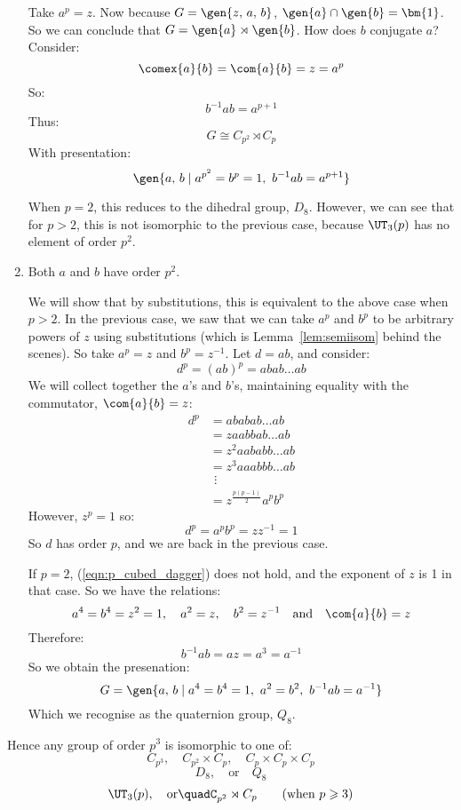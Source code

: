 \begin{enumerate}
        Take \(a^p = z\).
        Now because \(G = \gen{z,\,a,\,b}\), \(\gen{a} \cap \gen{b} = \bm{1}\).
        So we can conclude that \(G = \gen{a} \rtimes \gen{b}\).
        How does \(b\) conjugate \(a\)?
        Consider:
        \[\comex{a}{b} = \com{a}{b} = z = a^p\]
        So:
        \[b^{-1}ab = a^{p + 1}\]
        Thus:
        \[G \cong C_{p^2} \rtimes C_p\]
        With presentation:
        \[\gen{a,\,b \mid a^{p^2} = b^p = 1,\ b^{-1}ab = a^{p + 1}}\]

        When \(p = 2\), this reduces to the dihedral group, \(D_8\).
        However, we can see that for \(p > 2\), this is not isomorphic to the previous case, because \(\UT_3(p)\) has no
        element of order \(p^2\).

    \item Both \(a\) and \(b\) have order \(p^2\).

        We will show that by substitutions, this is equivalent to the above case when \(p > 2\).
        In the previous case, we saw that we can take \(a^p\) and \(b^p\) to be arbitrary powers of \(z\) using
        substitutions (which is Lemma~\ref{lem:semiisom} behind the scenes).
        So take \(a^p = z\) and \(b^p = z^{-1}\).
        Let \(d = ab\), and consider:
        \[ d^p = {(ab)}^p = abab\ldots ab\]
        We will collect together the \(a\)'s and \(b\)'s, maintaining equality with the commutator, \(\com{a}{b} = z\):
        \begin{align*}
            d^p &= ababab\ldots ab \\
            &= z aabbab\ldots ab \\
            &= z^2 aababb\ldots ab \\
            &= z^3 aaabbb\ldots ab \\
            &\ \,\vdots \\  %
            &= z^{\frac{p(p-1)}{2}} a^p b^p \tag{\(\dagger\)} \label{eqn:p_cubed_dagger}
        \end{align*}
        However, \(z^p = 1\) so:
        \[d^p = a^p b^p = zz^{-1} = 1\]
        So \(d\) has order \(p\), and we are back in the previous case.

        If \(p = 2\), (\ref{eqn:p_cubed_dagger}) does not hold, and the exponent of \(z\) is 1 in that case.
        So we have the relations:
        \[a^4 = b^4 = z^2 = 1, \quad a^2 = z, \quad b^2 = z^{-1} \quad \text{and} \quad \com{a}{b} = z\]
        Therefore:
        \[b^{-1}ab = az = a^3 = a^{-1}\]
        So we obtain the presenation:
        \[G = \gen{a,\,b \mid a^4 = b^4 = 1,\ a^2 = b^2,\ b^{-1}ab = a^{-1}}\]
        Which we recognise as the quaternion group, \(Q_8\).

\end{enumerate}

Hence any group of order \(p^3\) is isomorphic to one of:
\[%
    C_{p^3}, \quad%
    C_{p^2} \times C_p, \quad%
    C_p \times C_p \times C_p
\]
\[
    D_8, \quad \text{or} \quad%
    Q_8 \tag{when \(p = 2\)}
\]
\[
    \UT_3(p), \quad \text{or} \quad%
    C_{p^2} \rtimes C_p \tag{when \(p \geqslant 3\)}
\]

